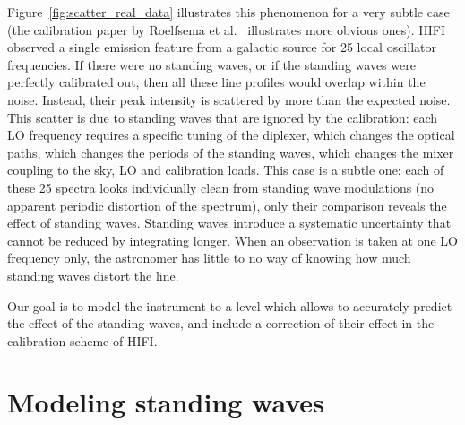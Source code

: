 \documentclass[journal]{IEEEtran}
\begin{document}
Figure~\ref{fig:scatter_real_data} illustrates this phenomenon for a very subtle case
(the calibration paper by Roelfsema et al.\ \cite{AA_537_A17} illustrates more obvious ones).
HIFI observed a single emission feature from a galactic source for 25 local oscillator frequencies.
If there were no standing waves, or if the standing waves were perfectly calibrated out, then all these line profiles would overlap within the noise.
Instead, their peak intensity is scattered by more than the expected noise.
This scatter is due to standing waves that are ignored by the calibration: each LO frequency requires a specific tuning of the diplexer, which changes the optical paths, which changes the periods of the standing waves, which changes the mixer coupling to the sky, LO and calibration loads.
This case is a subtle one: each of these 25 spectra looks individually clean from standing wave modulations (no apparent periodic distortion of the spectrum), only their comparison reveals the effect of standing waves.
Standing waves introduce a systematic uncertainty that cannot be reduced by integrating longer.
When an observation is taken at one LO frequency only, the astronomer has little to no way of knowing how much standing waves distort the line.

Our goal is to model the instrument to a level which allows to accurately predict the effect of the standing waves, and include a correction of their effect in the calibration scheme of HIFI.


\section{Modeling standing waves}
\end{document}

